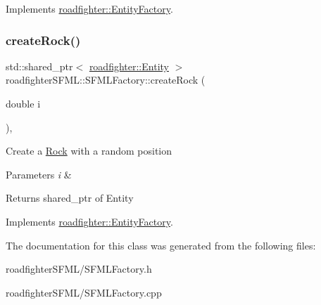 Implements \hyperlink{classroadfighter_1_1EntityFactory_a8fefd94a197c87544805461761fc111c}{roadfighter\+::\+Entity\+Factory}.

\mbox{\label{classroadfighterSFML_1_1SFMLFactory_ace05bdfcf9fc4f1ca7b9fc6f840b7a12}} 
\subsubsection{\texorpdfstring{create\+Rock()}{createRock()}}
{\footnotesize\ttfamily std\+::shared\+\_\+ptr$<$ \hyperlink{classroadfighter_1_1Entity}{roadfighter\+::\+Entity} $>$ roadfighter\+S\+F\+M\+L\+::\+S\+F\+M\+L\+Factory\+::create\+Rock (\begin{DoxyParamCaption}\item[{double}]{i }\end{DoxyParamCaption})\hspace{0.3cm}{\ttfamily [override]}, {\ttfamily [virtual]}}

Create a \hyperlink{classroadfighterSFML_1_1Rock}{Rock} with a random position 
\begin{DoxyParams}{Parameters}
{\em i} & \\
\hline
\end{DoxyParams}
\begin{DoxyReturn}{Returns}
shared\+\_\+ptr of Entity 
\end{DoxyReturn}


Implements \hyperlink{classroadfighter_1_1EntityFactory_a3bcb7e8b8ca62628c842962cfbba50be}{roadfighter\+::\+Entity\+Factory}.



The documentation for this class was generated from the following files\+:\begin{DoxyCompactItemize}
\item 
roadfighter\+S\+F\+M\+L/S\+F\+M\+L\+Factory.\+h\item 
roadfighter\+S\+F\+M\+L/S\+F\+M\+L\+Factory.\+cpp\end{DoxyCompactItemize}

